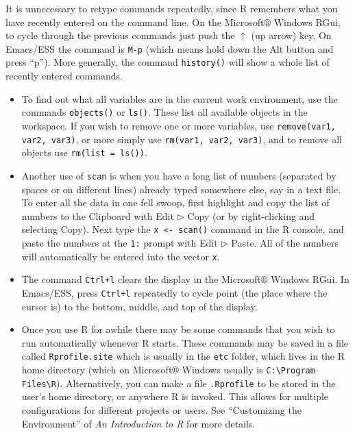 \documentclass[captions=tableheading]{scrbook}
\begin{document}
It is unnecessary to retype commands repeatedly, since \textsf{R} remembers what you have recently entered on the command line. On the Microsoft\(\circledR\) Windows \textsf{R}Gui, to cycle through the previous commands just push the \(\uparrow\) (up arrow) key. On Emacs/ESS the command is \texttt{M-p} (which means hold down the \textsf{Alt} button and press ``p''). More generally, the command \texttt{history()} will show a whole list of recently entered commands. 
\begin{itemize}
\item To find out what all variables are in the current work environment, use the commands \texttt{objects()} or \texttt{ls()}. These list all available objects in the workspace. If you wish to remove one or more variables, use \texttt{remove(var1, var2, var3)}, or more simply use \texttt{rm(var1, var2, var3)}, and to remove all objects use \texttt{rm(list = ls())}.
\item Another use of \texttt{scan} is when you have a long list of numbers (separated by spaces or on different lines) already typed somewhere else, say in a text file. To enter all the data in one fell swoop, first highlight and copy the list of numbers to the Clipboard with \textsf{Edit} \textsf{\(\triangleright\)} \textsf{Copy} (or by right-clicking and selecting \textsf{Copy}). Next type the \texttt{x <- scan()} command in the \textsf{R} console, and paste the numbers at the \texttt{1:} prompt with \textsf{Edit} \textsf{\(\triangleright\)} \textsf{Paste}. All of the numbers will automatically be entered into the vector \texttt{x}.
\item The command \texttt{Ctrl+l} clears the display in the Microsoft\(\circledR\) Windows \textsf{R}Gui. In Emacs/ESS, press \texttt{Ctrl+l} repeatedly to cycle point (the place where the cursor is) to the bottom, middle, and top of the display.
\item Once you use \textsf{R} for awhile there may be some commands that you wish to run automatically whenever \textsf{R} starts. These commands may be saved in a file called \texttt{Rprofile.site} which is usually in the \texttt{etc} folder, which lives in the \textsf{R} home directory (which on Microsoft\(\circledR\) Windows usually is \texttt{C:\textbackslash{}Program Files\textbackslash{}R}). Alternatively, you can make a file \texttt{.Rprofile} to be stored in the user's home directory, or anywhere \textsf{R} is invoked. This allows for multiple configurations for different projects or users. See ``Customizing the Environment'' of \emph{An Introduction to R} for more details.

\end{itemize}
\end{document}
